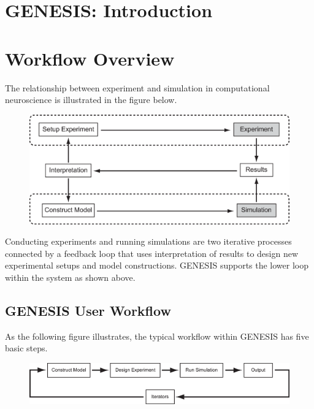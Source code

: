 \documentclass[12pt]{article}
\begin{document}
\section*{GENESIS: Introduction}

\section*{Workflow Overview}

The relationship between experiment and simulation in computational neuroscience is illustrated in the figure below.  

\begin{figure}[h]
   \centering
   \includegraphics[scale=0.4]{figures/Exp-Sim-8.eps}
   \label{fig:df-1}
\end{figure}

Conducting experiments and running simulations are two iterative processes connected by a feedback loop that uses interpretation of results to design new experimental setups and model constructions. GENESIS supports the lower loop within the system as shown above.

\subsection*{GENESIS User Workflow}

As the following figure illustrates, the typical workflow within GENESIS has five basic steps. 
\begin{figure}[h]
   \centering
   \includegraphics[scale=0.5]{figures/workflow.eps}
   \label{fig:df-1}
\end{figure}
\end{document}
